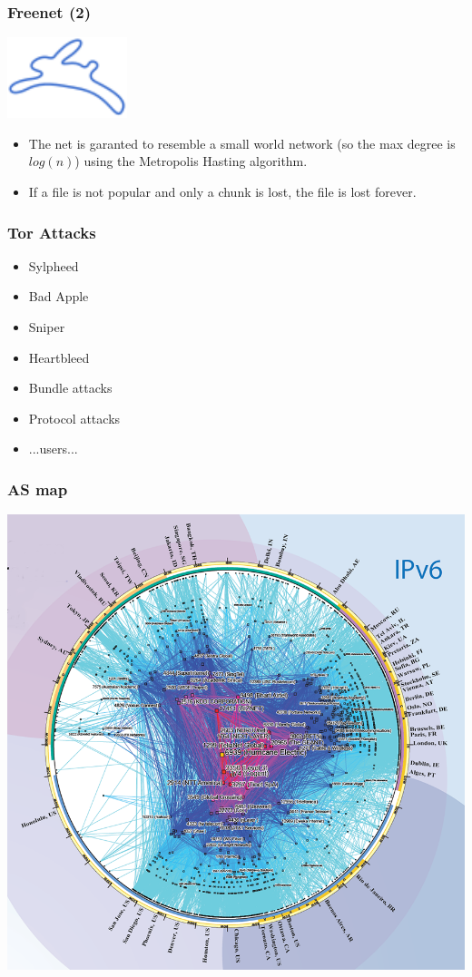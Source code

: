 \begin{frame}[noframenumbering]
	\frametitle{Freenet (2)}
	\begin{center}
	\includegraphics[scale=0.7]{imgs/Freenet_logo}
	\end{center}
	\begin{itemize}
		\item The net is garanted to resemble a small world network (so the max degree is
		$log(n)$) using the Metropolis Hasting algorithm.
		\item If a file is not popular and only a chunk is lost, the
		file is lost forever.
	\end{itemize}
\end{frame}

\begin{frame}[noframenumbering]
	\frametitle{Tor Attacks}
	\begin{itemize}
		\item Sylpheed
		\item Bad Apple
		\item Sniper
		\item Heartbleed
		\item Bundle attacks
		\item Protocol attacks
		\item ...users...
	\end{itemize}
\end{frame}

\begin{frame}
	\frametitle{AS map}
	\begin{center}
	\includegraphics[scale=0.5]{imgs/as}
	\end{center}
\end{frame}
